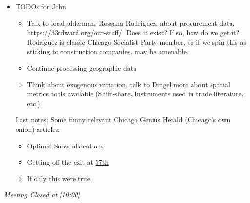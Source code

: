 \documentclass[10pt,a4paper,twoside]{mins}
\begin{document}
\begin{minutes}
\begin{business}
\begin{itemize}
\item TODOs for John
\begin{itemize}
    \item Talk to local alderman, Rossana Rodriguez, about procurement data. https://33rdward.org/our-staff/. Does it exist? If so, how do we get it? Rodriguez is classic Chicago Socialist Party-member, so if we spin this as sticking to construction companies, may be amenable. 
    \item Continue processing geographic data
    \item Think about exogenous variation, talk to Dingel more about spatial metrics tools available (Shift-share, Instruments used in trade literature, etc.)
\end{itemize}
Last notes: Some funny relevant Chicago Genius Herald (Chicago's own onion) articles:

\begin{itemize}
    \item Optimal \href{https://thechicagogenius.com/chicago/mayor-lightfoot-donates-all-her-blocks-snowfall-nearby-neighborhood}{Snow allocations}
    \item Getting off the exit at \href{https://thechicagogenius.com/chicago/potholes-begin-fattening-winter}{57th}
    \item If only \href{https://thechicagogenius.com/chicago-wards/chicago-city-council-agrees-redraw-ward-map-tavern-style}{this were true}
\end{itemize}
\end{itemize}
\end{business}
\begin{center}\emph{Meeting Closed at [10:00]}\end{center}
\end{minutes}
\end{document}
